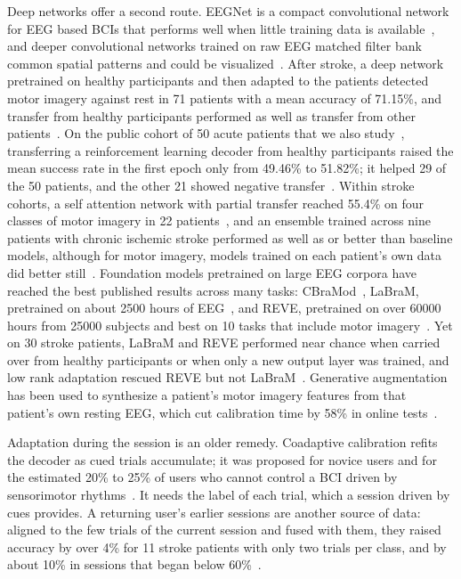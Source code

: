 \documentclass{ieeeaccess}
\begin{document}
Deep networks offer a second route. EEGNet is a compact convolutional network for EEG based BCIs that performs well when little training data is available~\cite{lawhern2018}, and deeper convolutional networks trained on raw EEG matched filter bank common spatial patterns and could be visualized~\cite{schirrmeister2017}. After stroke, a deep network pretrained on healthy participants and then adapted to the patients detected motor imagery against rest in 71 patients with a mean accuracy of 71.15\%, and transfer from healthy participants performed as well as transfer from other patients~\cite{nagarajan2024}. On the public cohort of 50 acute patients that we also study~\cite{liu2024}, transferring a reinforcement learning decoder from healthy participants raised the mean success rate in the first epoch only from 49.46\% to 51.82\%; it helped 29 of the 50 patients, and the other 21 showed negative transfer~\cite{via2026}. Within stroke cohorts, a self attention network with partial transfer reached 55.4\% on four classes of motor imagery in 22 patients~\cite{ma2024}, and an ensemble trained across nine patients with chronic ischemic stroke performed as well as or better than baseline models, although for motor imagery, models trained on each patient's own data did better still~\cite{lee2024ensemble}. Foundation models pretrained on large EEG corpora have reached the best published results across many tasks: CBraMod~\cite{wang2025cbramod}, LaBraM, pretrained on about 2500 hours of EEG~\cite{jiang2024labram}, and REVE, pretrained on over 60000 hours from 25000 subjects and best on 10 tasks that include motor imagery~\cite{elouahidi2025reve}. Yet on 30 stroke patients, LaBraM and REVE performed near chance when carried over from healthy participants or when only a new output layer was trained, and low rank adaptation rescued REVE but not LaBraM~\cite{nguyen2026}. Generative augmentation has been used to synthesize a patient's motor imagery features from that patient's own resting EEG, which cut calibration time by 58\% in online tests~\cite{xu2026}.

Adaptation during the session is an older remedy. Coadaptive calibration refits the decoder as cued trials accumulate; it was proposed for novice users and for the estimated 20\% to 25\% of users who cannot control a BCI driven by sensorimotor rhythms~\cite{vidaurre2011}. It needs the label of each trial, which a session driven by cues provides. A returning user's earlier sessions are another source of data: aligned to the few trials of the current session and fused with them, they raised accuracy by over 4\% for 11 stroke patients with only two trials per class, and by about 10\% in sessions that began below 60\%~\cite{giles2022}.
\end{document}
